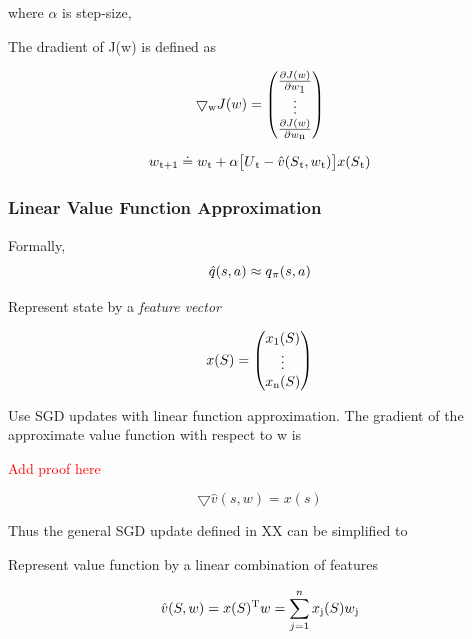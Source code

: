 \documentclass[12pt,twoside]{report}
\theoremstyle{plain}
\theoremstyle{definition}
\begin{document}
where $\alpha$ is step-size, 

The dradient of J(w) is defined as 

\begin{equation}
\bigtriangledown\textsubscript{w} J(w) =  \begin{pmatrix} \frac{\partial J(w)}{\partial w\textsubscript{1}}  \\ \vdots \\ \frac{\partial J(w)}{\partial w\textsubscript{n}}   \end{pmatrix}
\end{equation}

\begin{equation}
w\textsubscript{t+1} \doteq w\textsubscript{t} + \alpha \big[ U\textsubscript{t} - \hat{v}(S\textsubscript{t}, w\textsubscript{t})\big] x(S\textsubscript{t})
\end{equation}

\subsubsection{Linear Value Function Approximation}

Formally,
\begin{equation}
\hat{q}(s,a) \approx q\textsubscript{$\pi$} (s,a)
\end{equation}

Represent state by a \textit{feature vector}

\begin{equation}
x(S) = \begin{pmatrix} x\textsubscript{1}(S) \\ \vdots \\ x\textsubscript{n}(S)  \end{pmatrix}
\end{equation}

Use SGD updates with linear function approximation. The gradient of the approximate value function with respect to w is 

\textcolor{red}{Add proof here}

\begin{equation}
\bigtriangledown \hat{v}(s,w) = x(s)
\end{equation}

Thus the general SGD update defined in XX can be simplified to 

Represent value function by a linear combination of features

\begin{equation}
\hat{v}(S,w) = x(S)\textsuperscript{T}w = \sum_{j=1}^{n} x\textsubscript{j} (S) w\textsubscript{j}
\end{equation}
\end{document}
